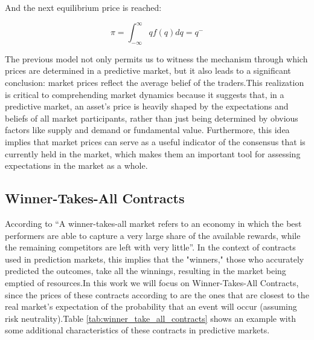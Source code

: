 And the next equilibrium price is reached:

\begin{equation}
    \pi = \int_{-\infty}^{\infty} q f(q) dq = q^-
\end{equation}

The previous model not only permits us to witness the mechanism through which prices are determined in a predictive market, but it also leads to a significant conclusion: market prices reflect the average belief of the traders.This realization is critical to comprehending market dynamics because it suggests that, in a predictive market, an asset's price is heavily shaped by the expectations and beliefs of all market participants, rather than just being determined by obvious factors like supply and demand or fundamental value. Furthermore, this idea implies that market prices can serve as a useful indicator of the consensus that is currently held in the market, which makes them an important tool for assessing expectations in the market as a whole. 

\subsection{Winner-Takes-All Contracts}
\label{subsec:winner_takes_all_contracts}

According to \cite{Hayes} “A winner-takes-all market refers to an economy in which the best performers are able to capture a very large share of the available rewards, while the remaining competitors are left with very little”. In the context of contracts used in prediction markets, this implies that the "winners," those who accurately predicted the outcomes, take all the winnings, resulting in the market being emptied of resources.In this work we will focus on Winner-Takes-All Contracts, since the prices of these contracts according to \cite{Zitzewitz2004} are the ones that are closest to the real market's expectation of the probability that an event will occur (assuming risk neutrality).Table \ref{tab:winner_take_all_contracts} shows an example with some additional characteristics of these contracts in predictive markets.

